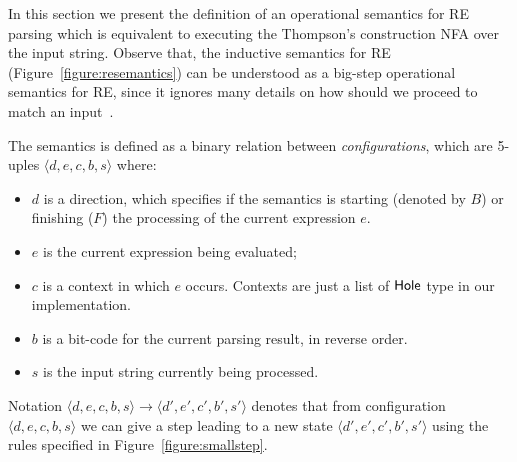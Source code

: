 \documentclass[sigplan]{acmart}
\theoremstyle{definition}
\newcommand{\D}[1]{\blue{\mathsf{#1}}}
\newcommand{\conf}[1]{\ensuremath{\langle #1 \rangle}}
\begin{document}
In this section we present the definition of an operational semantics for RE parsing which is
equivalent to executing the Thompson's construction NFA over the input string. Observe that,
the inductive semantics for RE (Figure~\ref{figure:resemantics}) can be understood as a big-step
operational semantics for RE, since it ignores many details on how should we proceed to match
an input~\cite{Rathnayake2011}.

The semantics is defined as a binary relation between \emph{configurations}, which are 5-uples
$\conf{d,e,c,b,s}$ where:
\begin{itemize}
  \item $d$ is a direction, which specifies if the semantics is starting (denoted by $B$) or
        finishing ($F$) the processing of the current expression $e$.
  \item $e$ is the current expression being evaluated;
  \item $c$ is a context in which $e$ occurs. Contexts are just a list of
        \ensuremath{\D{Hole}} type in our implementation.
  \item $b$ is a bit-code for the current parsing result, in reverse order.
  \item $s$ is the input string currently being processed.
\end{itemize}
Notation $\conf{d,e,c,b,s}\to\conf{d',e',c',b',s'}$ denotes that from
configuration $\conf{d,e,c,b,s}$ we can give a step leading to a new state
$\conf{d',e',c',b',s'}$ using the rules specified in Figure~\ref{figure:smallstep}.
\end{document}
